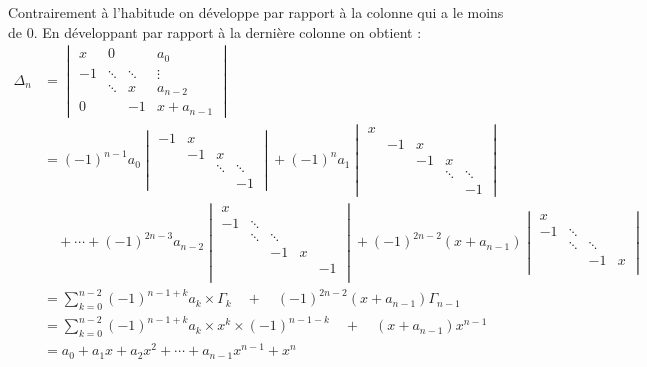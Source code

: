 {{Contrairement à l'habitude on développe par rapport à la colonne qui a le moins de $0$.
En développant par rapport à la dernière colonne on obtient :
{\footnotesize
\begin{align*}
 \Delta_{n}
& =
   \begin{vmatrix}
   x &  0    &        & a_{0}   \\
    -1 &\ddots &\ddots  &\vdots  \\
      &\ddots &x      & a_{n-2} \\
    0 &       & -1      & x+a_{n-1}
   \end{vmatrix} \\
 & = (-1)^{n-1} a_0 
   \begin{vmatrix}
   -1 &  x    &        &    \\
     & -1 & x  &  \\
      & & \ddots & \ddots       \\
     &       &       & -1
   \end{vmatrix}
+ (-1)^{n} a_1   
\begin{vmatrix}
   x & &&&\\
   & -1 &  x    &        &    \\
   &  & -1 & x  &  \\
    &  & & \ddots & \ddots       \\
    & &       &       & -1
   \end{vmatrix} 
\\
& \quad + \cdots +
(-1)^{2n-3} a_{n-2}   
\begin{vmatrix}
  x &      &    & &      \\
    -1 &\ddots &  & & \\
     &\ddots &\ddots & &  \\
      && -1 & x    &   \\
    &&&& -1 \\
   \end{vmatrix}
+ (-1)^{2n-2}(x+a_{n-1})
\begin{vmatrix}
  x &      &    &       \\
    -1 &\ddots &  &  \\
     &\ddots &\ddots &   \\
    &  & -1 & x       \\
   \end{vmatrix} \\
 & = \sum_{k=0}^{n-2} (-1)^{n-1+k} a_ k \times \Gamma_k \quad  + \quad (-1)^{2n-2}(x+a_{n-1})\Gamma_{n-1} \\
 & = \sum_{k=0}^{n-2} (-1)^{n-1+k} a_ k \times x^k\times (-1)^{n-1-k} \quad + \quad (x+a_{n-1})x^{n-1}\\
 & = a_0+a_1x+a_2x^2+\cdots + a_{n-1}x^{n-1} + x^n\\
\end{align*}
}
}
}
